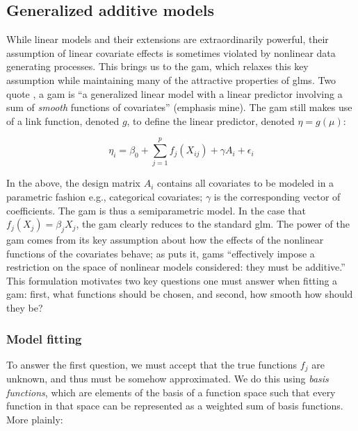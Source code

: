 \documentclass{report}
\begin{document}
\subsection{Generalized additive models}

While linear models and their extensions are extraordinarily powerful, their assumption of linear covariate effects is sometimes violated by nonlinear data generating processes. This brings us to the \gls{gam}, which relaxes this key assumption while maintaining many of the attractive properties of \glspl{glm}. Two quote \cite[Chapter~4.1]{wood_generalized_2017}, a \gls{gam} is ``a generalized linear model with a linear predictor involving a sum of \textit{smooth} functions of covariates'' (emphasis mine). The \gls{gam} still makes use of a link function, denoted $g$, to define the linear predictor, denoted $\eta = g(\mu)$:

\begin{equation}\label{eq:glm-gam-model-form}
    \eta_i = \beta_0 + \sum_{j=1}^p f_j(X_{ij}) + \gamma A_i + \epsilon_i
\end{equation}

In the above, the design matrix $A_i$ contains all covariates to be modeled in a parametric fashion e.g., categorical covariates; $\gamma$ is the corresponding vector of coefficients. The \gls{gam} is thus a semiparametric model. In the case that $f_j(X_j) = \beta_j X_j$, the \gls{gam} clearly reduces to the standard \gls{glm}. The power of the \gls{gam} comes from its key assumption about how the effects of the nonlinear functions of the covariates behave; as \cite[Lecture~14]{molstad_sta_2022} puts it, \glspl{gam} ``effectively impose a restriction on the space of nonlinear models considered: they must be additive.'' This formulation motivates two key questions one must answer when fitting a \gls{gam}: first, what functions should be chosen, and second, how smooth how should they be?

\subsubsection{Model fitting}

To answer the first question, we must accept that the true functions $f_j$ are unknown, and thus must be somehow approximated. We do this using \textit{basis functions}, which are elements of the basis of a function space such that every function in that space can be represented as a weighted sum of basis functions. More plainly:
\end{document}
